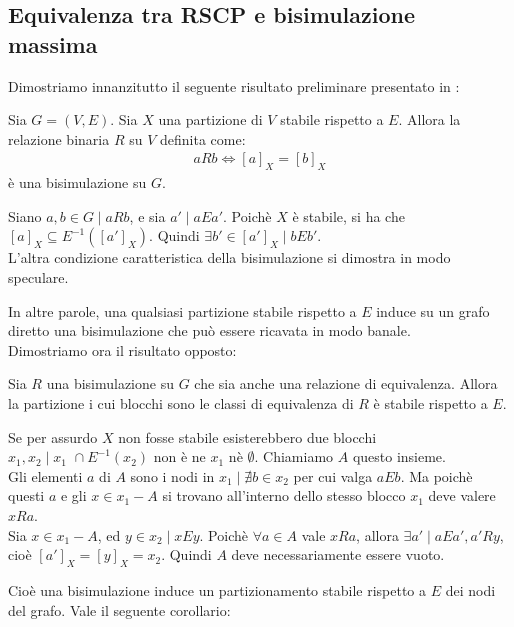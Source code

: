 \subsection{Equivalenza tra RSCP e bisimulazione massima}
Dimostriamo innanzitutto il seguente risultato preliminare presentato in \cite{gentilini}:
\begin{proposition}
    Sia $G = (V,E)$. Sia $X$ una partizione di $V$ stabile rispetto a $E$. Allora la relazione binaria $R$ su $V$ definita come:
    \begin{gather*}
        a R b \iff [a]_X = [b]_X
    \end{gather*}
    è una bisimulazione su $G$.
    \label{prop:part_induce_bisi}
\end{proposition}
\begin{proof2}
    Siano $a,b \in G \mid a R b$, e sia $a' \mid a E a'$. Poichè $X$ è stabile, si ha che $[a]_X \subseteq E^{-1}([a']_X)$. Quindi $\exists b' \in [a']_X \mid b E b'$.\\
    L'altra condizione caratteristica della bisimulazione si dimostra in modo speculare.
\end{proof2}
In altre parole, una qualsiasi partizione stabile rispetto a $E$ induce su un grafo diretto una bisimulazione che può essere ricavata in modo banale.\\
Dimostriamo ora il risultato opposto:
\begin{proposition}
    Sia $R$ una bisimulazione su $G$ che sia anche una relazione di equivalenza. Allora la partizione i cui blocchi sono le classi di equivalenza di $R$ è stabile rispetto a $E$.
    \label{prop:bisi_induce_part}
\end{proposition}
\begin{proof2}
    Se per assurdo $X$ non fosse stabile esisterebbero due blocchi $x_1, x_2 \mid x_1 \,\,\cap E^{-1}(x_2)$ non è ne $x_1$ nè $\emptyset$. Chiamiamo $A$ questo insieme.\\
    Gli elementi $a$ di $A$ sono i nodi in $x_1 \mid \nexists b \in x_2$ per cui valga $a E b$. Ma poichè questi $a$ e gli $x \in x_1 - A$ si trovano all'interno dello stesso blocco $x_1$ deve valere $x R a$.\\
    Sia $x \in x_1 - A$, ed $y \in x_2 \mid x E y$. Poichè $\forall a \in A$ vale $x R a$, allora $\exists a' \mid a E a', a' R y$, cioè $[a']_X = [y]_X = x_2$. Quindi $A$ deve necessariamente essere vuoto.
\end{proof2}
Cioè una bisimulazione induce un partizionamento stabile rispetto a $E$ dei nodi del grafo. Vale il seguente corollario:
